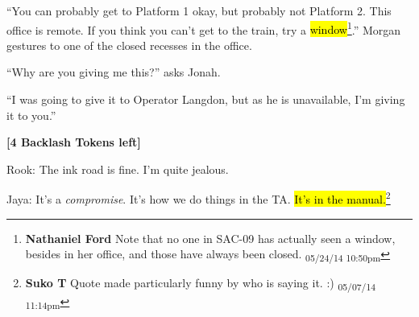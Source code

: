 ``You can probably get to Platform 1 okay, but probably not Platform 2.  This office is remote.  If you think you can't get to the train, try a \hl{window}\footnote{\textbf{Nathaniel Ford }Note that no one in SAC-09 has actually seen a window, besides in her office, and those have always been closed. \textsubscript{05/24/14 10:50pm}}.'' Morgan gestures to one of the closed recesses in the office. 

``Why are you giving me this?'' asks Jonah.

``I was going to give it to Operator Langdon, but as he is unavailable, I'm giving it to you.''





\textbf{{[}4 Backlash Tokens left{]}}










Rook: The ink road is fine.  I'm quite jealous.




Jaya: It's a \textit{compromise}.  It's how we do things in the TA.  \hl{It's in the manual.}\footnote{\textbf{Suko T }Quote made particularly funny by who is saying it. :) \textsubscript{05/07/14 11:14pm}}






